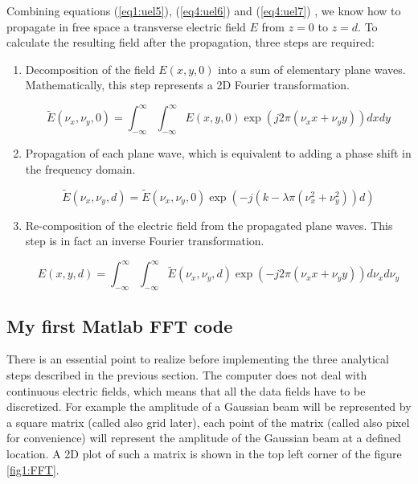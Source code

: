 Combining equations (\ref{eq1:uel5}), (\ref{eq4:uel6}) and (\ref{eq4:uel7}) , we know how to propagate in free space a transverse electric field $E$ from $z = 0$ to $z = d$. To calculate the resulting field after the propagation, three steps are required:
\begin{enumerate}

\item Decomposition of the field $E(x,y,0)$ into a sum of elementary plane waves. Mathematically, this step represents a 2D Fourier transformation.

\begin{equation}
 \widetilde{E}(\nu_x,\nu_y,0) = \int_{-\infty}^{\infty} \int_{-\infty}^{\infty} E(x,y,0) \exp(j 2\pi (\nu_x x + \nu_y y)) dx dy
\label{eq1:uel10}
\end{equation}

\item Propagation of each plane wave, which is equivalent to adding a phase shift in the frequency domain.


\begin{equation}
 \widetilde{E}(\nu_x,\nu_y,d) =  \widetilde{E}(\nu_x,\nu_y,0) \exp(-j (k - \lambda \pi (\nu_x^2 + \nu_y^2))d)
\label{eq1:uel11}
\end{equation}

\item Re-composition of the electric field from the propagated plane waves. This step is in fact an inverse Fourier transformation.

\begin{equation}
 E(x,y,d) = \int_{-\infty}^{\infty} \int_{-\infty}^{\infty}  \widetilde{E}(\nu_x,\nu_y,d) \exp(- j 2\pi (\nu_x x + \nu_y y)) d\nu_x d\nu_y
\label{eq1:uel12}
\end{equation}
\end{enumerate}


\subsection{My first Matlab FFT code}

There is an essential point to realize before implementing the three analytical steps described in the previous section. The computer does not deal with continuous electric fields, which means that all the data fields have to be discretized. For example the amplitude of a Gaussian beam will be represented by a square matrix (called also grid later), each point of the matrix (called also pixel for convenience) will represent the amplitude of the Gaussian beam at a defined location. A 2D plot of such a matrix is shown in the top left corner of the figure \ref{fig1:FFT}.

